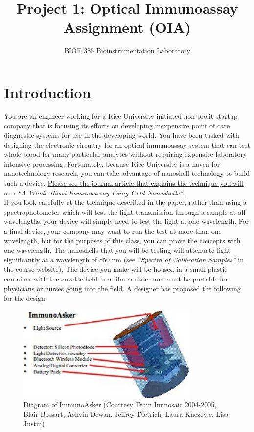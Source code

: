 \documentclass{article}
\title{Project 1: Optical Immunoassay Assignment (OIA)}
\author{BIOE 385 Bioinstrumentation Laboratory}
\date{}
\begin{document}
\large
\maketitle
\section*{Introduction}
You are an engineer working for a Rice University initiated non-profit startup company that is focusing its efforts on developing inexpensive point of care diagnostic systems for use in the developing world. You have been tasked with designing the electronic circuitry for an optical immunoassay system that can test whole blood for many particular analytes without requiring expensive laboratory intensive processing. Fortunately, because Rice University is a haven for nanotechnology research, you can take advantage of nanoshell technology to build such a device. \href{https://github.com/jlongc12/BIOE_385/blob/main/project_1_OIA/immunoassay_article.pdf}{Please see the journal article that explains the technique you will use: \textit{“A Whole Blood Immunoassay Using Gold Nanoshells”}.}\\

If you look carefully at the technique described in the paper, rather than using a spectrophotometer which will test the light transmission through a sample at all wavelengths, your device will simply need to test the light at one wavelength. For a final device, your company may want to run the test at more than one wavelength, but for the purposes of this class, you can prove the concepts with one wavelength. The nanoshells that you will be testing will attenuate light significantly at a wavelength of 850 nm (see \textit{“Spectra of Calibration Samples”} in the course website). The device you make will be housed in a small plastic container with the cuvette held in a film canister and must be portable for physicians or nurses going into the field. A designer has proposed the following for the design:

\begin{figure}[h]
    \includegraphics[width=0.8\textwidth]{fig_1.jpg}
    \centering
\caption{Diagram of ImmunoAsker (Courtesy Team Immosaic 2004-2005, Blair Bossart, Ashvin Dewan, Jeffrey
Dietrich, Laura Knezevic, Lisa Justin)}
\label{fig_1}
\end{figure}
\end{document}
